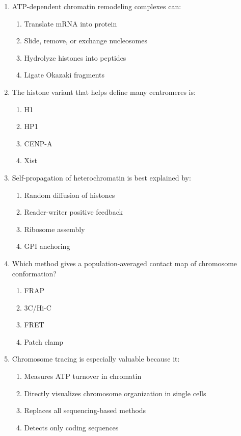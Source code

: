 \documentclass[12pt,fontset=none]{ctexart}
\begin{document}
\begin{enumerate}
\item ATP-dependent chromatin remodeling complexes can:
\begin{enumerate}[label=\alph*.]
\item Translate mRNA into protein
\item Slide, remove, or exchange nucleosomes
\item Hydrolyze histones into peptides
\item Ligate Okazaki fragments
\end{enumerate}

\item The histone variant that helps define many centromeres is:
\begin{enumerate}[label=\alph*.]
\item H1
\item HP1
\item CENP-A
\item Xist
\end{enumerate}

\item Self-propagation of heterochromatin is best explained by:
\begin{enumerate}[label=\alph*.]
\item Random diffusion of histones
\item Reader-writer positive feedback
\item Ribosome assembly
\item GPI anchoring
\end{enumerate}

\item Which method gives a population-averaged contact map of chromosome conformation?
\begin{enumerate}[label=\alph*.]
\item FRAP
\item 3C/Hi-C
\item FRET
\item Patch clamp
\end{enumerate}

\item Chromosome tracing is especially valuable because it:
\begin{enumerate}[label=\alph*.]
\item Measures ATP turnover in chromatin
\item Directly visualizes chromosome organization in single cells
\item Replaces all sequencing-based methods
\item Detects only coding sequences
\end{enumerate}


\end{enumerate}
\end{document}
